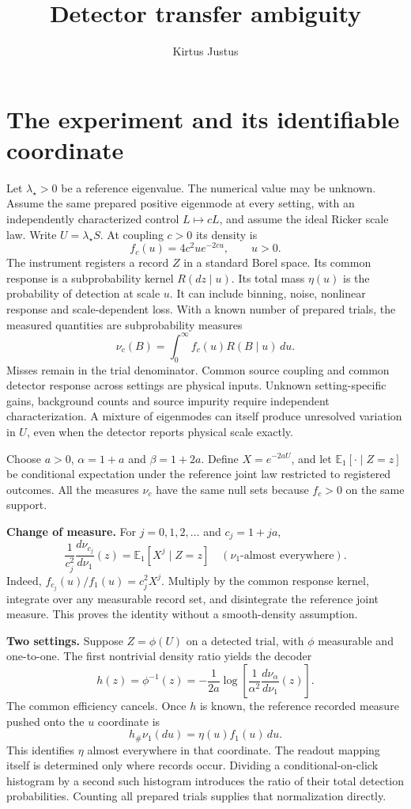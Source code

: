 \documentclass[10pt,a4paper]{article}
\title{Detector transfer ambiguity}\author{Kirtus Justus}\date{}
\begin{document}
\maketitle
\section{The experiment and its identifiable coordinate}
Let $\lambda_\star>0$ be a reference eigenvalue. The numerical value may be unknown. Assume the same prepared positive eigenmode at every setting, with an independently characterized control $L\mapsto cL$, and assume the ideal Ricker scale law. Write $U=\lambda_\star S$. At coupling $c>0$ its density is
\[
 f_c(u)=4c^2u e^{-2cu},\qquad u>0.
\]
The instrument registers a record $Z$ in a standard Borel space. Its common response is a subprobability kernel $R(dz\mid u)$. Its total mass $\eta(u)$ is the probability of detection at scale $u$. It can include binning, noise, nonlinear response and scale-dependent loss. With a known number of prepared trials, the measured quantities are subprobability measures
\[
 \nu_c(B)=\int_0^\infty f_c(u)R(B\mid u)\,du.
\]
Misses remain in the trial denominator. Common source coupling and common detector response across settings are physical inputs. Unknown setting-specific gains, background counts and source impurity require independent characterization. A mixture of eigenmodes can itself produce unresolved variation in $U$, even when the detector reports physical scale exactly.

Choose $a>0$, $\alpha=1+a$ and $\beta=1+2a$. Define $X=e^{-2aU}$, and let $\mathbb E_1[\cdot\mid Z=z]$ be conditional expectation under the reference joint law restricted to registered outcomes. All the measures $\nu_c$ have the same null sets because $f_c>0$ on the same support.

\textbf{Change of measure.} For $j=0,1,2,\ldots$ and $c_j=1+ja$,
\[
 \frac1{c_j^2}\frac{d\nu_{c_j}}{d\nu_1}(z)=\mathbb E_1[X^j\mid Z=z]
 \quad (\nu_1\text{-almost everywhere}).
\]
Indeed, $f_{c_j}(u)/f_1(u)=c_j^2X^j$. Multiply by the common response kernel, integrate over any measurable record set, and disintegrate the reference joint measure. This proves the identity without a smooth-density assumption.

\textbf{Two settings.} Suppose $Z=\phi(U)$ on a detected trial, with $\phi$ measurable and one-to-one. The first nontrivial density ratio yields the decoder
\[
 h(z)=\phi^{-1}(z)=-\frac1{2a}\log\!\left[\frac1{\alpha^2}\frac{d\nu_\alpha}{d\nu_1}(z)\right].
\]
The common efficiency cancels. Once $h$ is known, the reference recorded measure pushed onto the $u$ coordinate is
\[
 h_\#\nu_1(du)=\eta(u) f_1(u)\,du.
\]
This identifies $\eta$ almost everywhere in that coordinate. The readout mapping itself is determined only where records occur. Dividing a conditional-on-click histogram by a second such histogram introduces the ratio of their total detection probabilities. Counting all prepared trials supplies that normalization directly.
\end{document}
